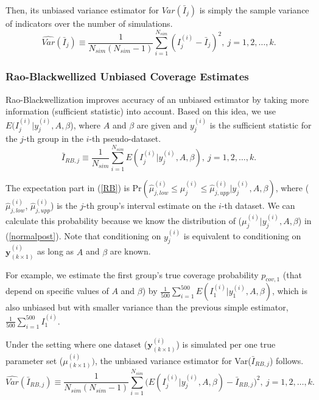 \documentclass[article]{jss}
\begin{document}
Then, its unbiased variance estimator  for $Var(\bar{I}_{j})$ is simply the sample variance of indicators over the number of simulations.
\begin{equation}\label{svar}
\widehat{Var}(\bar{I}_{j})\equiv\frac{1}{N_{sim}(N_{sim}-1)}\sum_{i=1}^{N_{sim}}(I^{(i)}_{j}-\bar{I}_{j})^{2},~ j=1, 2, \ldots, k.
\end{equation}


\subsubsection{Rao-Blackwellized Unbiased Coverage Estimates}
Rao-Blackwellization improves accuracy of an unbiased estimator by taking more information (sufficient statistic) into account. Based on this idea, we use $E(I^{(i)}_{j}\vert y^{(i)}_{j}, A, \beta$), where $A$ and $\beta$ are given and $y^{(i)}_{j}$ is the sufficient statistic for the $j$-th group in the $i$-th pseudo-dataset. 
\begin{equation}\label{RB}
\bar{I}_{RB, j}\equiv \frac{1}{N_{sim}}\sum_{i=1}^{N_{sim}}E(I^{(i)}_{j}\vert y^{(i)}_{j}, A, \beta),~ j=1, 2, \ldots, k.
\end{equation}

The expectation part in (\ref{RB}) is Pr$(\hat{\mu}^{(i)}_{j, low}\le \mu^{(i)}_{j} \le\hat{\mu}^{(i)}_{j, upp}\vert y^{(i)}_{j}, A, \beta)$, where ($\hat{\mu}^{(i)}_{j, low}$, $\hat{\mu}^{(i)}_{j, upp}$) is the $j$-th group's interval estimate on the $i$-th dataset. We can calculate this probability  because we know the distribution of ($\mu^{(i)}_{j} \vert y^{(i)}_{j}, A, \beta$) in (\ref{normalpost}). Note that conditioning on $y^{(i)}_{j}$ is equivalent to conditioning on $\mathbf{y}^{(i)}_{(k\times1)}$ as long as $A$ and $\beta$ are known. 

For example, we estimate the first group's true coverage probability $p_{cov, 1}$ (that depend on specific values of $A$ and $\beta$) by $\frac{1}{500}\sum_{i=1}^{500}E(I^{(i)}_{1}\vert y^{(i)}_{1}, A, \beta)$, which is also unbiased but with smaller variance than the previous simple estimator, $\frac{1}{500}\sum_{i=1}^{500}I^{(i)}_{1}$.

Under the setting where one dataset ($\mathbf{y}^{(i)}_{(k\times1)}$) is simulated per one true parameter set ({\boldmath $\mu$}$^{(i)}_{(k\times1)})$, the unbiased variance estimator for Var($\bar{I}_{RB, j}$) follows.
\begin{equation}\label{RBvar}
\widehat{Var}(\bar{I}_{RB, j})\equiv\frac{1}{N_{sim}(N_{sim}-1)}\sum_{i=1}^{N_{sim}}\bigg(E(I^{(i)}_{j}\vert y^{(i)}_{j}, A, \beta)-\bar{I}_{RB, j}\bigg)^{2},~ j=1, 2, \ldots, k.
\end{equation}
\end{document}
